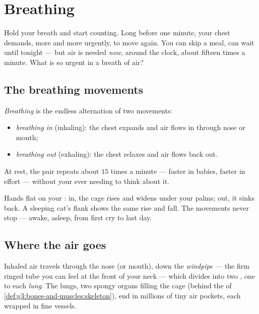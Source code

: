 \chapter{Breathing}\label{ch:g4:breathing}

Hold your breath and start counting. Long before one minute,
your chest demands, more and more urgently, to move again. You
can skip a meal,  can wait until tonight --- but air is
needed \emph{now}, around the clock, about fifteen times a
minute. What is so urgent in a breath of air?

\section{The breathing movements}

\begin{definition}\label{def:g4:breathing:movements}
\emph{Breathing} is the endless alternation of
two movements:
\begin{itemize}
  \item \emph{breathing in} (inhaling): the
        chest expands and air flows in through nose or mouth;
  \item \emph{breathing out} (exhaling): the
        chest relaxes and air flows back out.
\end{itemize}
At rest, the pair repeats about $15$ times a minute --- faster
in babies, faster in effort --- without your ever needing to
think about it.
\end{definition}

\begin{example}\label{ex:g4:breathing:watch}
Hands flat on your :  in, the  cage rises and
widens under your palms;  out, it sinks back. A
sleeping cat's flank shows the same rise and fall. The
movements never stop --- awake, asleep, from first cry to last
day.
\end{example}

\section{Where the air goes}

\begin{definition}\label{def:g4:breathing:organs}
Inhaled air travels through the nose (or mouth), down the
\emph{windpipe} --- the firm ringed tube you
can feel at the front of your neck --- which divides into two
, one to each \emph{lung}. The lungs, two
spongy organs filling the  cage
(behind the  of \cref{def:g3:bones-and-muscles:skeleton}),
end in millions of tiny air pockets, each wrapped in fine
 vessels.
\end{definition}

